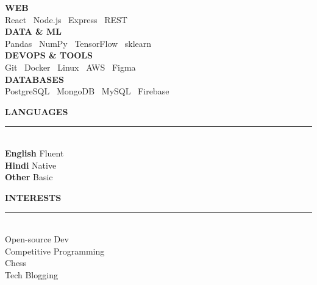\documentclass[10pt,a4paper]{article}
\newlength{\SW}\setlength{\SW}{6.3cm}    %
\newlength{\PH}\setlength{\PH}{29.7cm}   %
\newcommand{\sHead}[1]{%
  \vspace{10pt}%
  {\color{Amber}\bfseries\scriptsize\MakeUppercase{#1}}%
  \\[-3pt]{\color{Teal}\rule{\linewidth}{1.2pt}}\\[5pt]}
\begin{document}
\begin{minipage}[t][\PH][t]{\SW}
\begin{minipage}[t]{\dimexpr\SW-22pt\relax}
    {\color{Teal}\bfseries\scriptsize WEB}\\[2pt]
    {\color{white}\scriptsize
      React \textbullet\ Node.js \textbullet\ Express \textbullet\ REST}\\[5pt]

    {\color{Teal}\bfseries\scriptsize DATA \& ML}\\[2pt]
    {\color{white}\scriptsize
      Pandas \textbullet\ NumPy \textbullet\
      TensorFlow \textbullet\ sklearn}\\[5pt]

    {\color{Teal}\bfseries\scriptsize DEVOPS \& TOOLS}\\[2pt]
    {\color{white}\scriptsize
      Git \textbullet\ Docker \textbullet\ Linux \textbullet\
      AWS \textbullet\ Figma}\\[5pt]

    {\color{Teal}\bfseries\scriptsize DATABASES}\\[2pt]
    {\color{white}\scriptsize
      PostgreSQL \textbullet\ MongoDB \textbullet\
      MySQL \textbullet\ Firebase}

    \sHead{Languages}
    {\color{Amber}\bfseries\scriptsize English}\enspace
      {\color{white}\scriptsize Fluent}\\[3pt]
    {\color{Amber}\bfseries\scriptsize Hindi}\quad\enspace
      {\color{white}\scriptsize Native}\\[3pt]
    {\color{Amber}\bfseries\scriptsize Other}\quad\enspace
      {\color{white}\scriptsize Basic}

    \sHead{Interests}
    {\color{white}\scriptsize
      \faCode\enspace Open-source Dev\\[3pt]
      \faTrophy\enspace Competitive Programming\\[3pt]
      \faChessKnight\enspace Chess\\[3pt]
      \faPen\enspace Tech Blogging
    }

  \end{minipage}
\end{minipage}%
%
\end{document}
